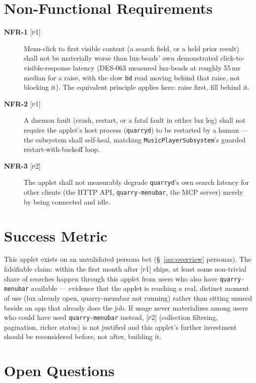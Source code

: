 \documentclass[a4paper,11pt]{report}
\newcommand{\nfr}[1]{\textbf{NFR-#1}}
\newcommand{\pone}{\textsc{[p1]}}
\newcommand{\ptwo}{\textsc{[p2]}}
\begin{document}
\section{Non-Functional Requirements}

\begin{description}
  \item[\nfr{1} \pone{}] Menu-click to first visible content (a search
    field, or a held prior result) shall not be materially worse than
    lux-beads' own demonstrated click-to-visible-response latency
    (DES-063 measured lux-beads at roughly 55\,ms median for a raise, with
    the slow \texttt{bd} read moving behind that raise, not blocking it).
    The equivalent principle applies here: raise first, fill behind it.
  \item[\nfr{2} \pone{}] A daemon fault (crash, restart, or a fatal fault
    in either lux leg) shall not require the applet's host process
    (\texttt{quarryd}) to be restarted by a human --- the subsystem shall
    self-heal, matching \texttt{MusicPlayerSubsystem}'s guarded
    restart-with-backoff loop.
  \item[\nfr{3} \ptwo{}] The applet shall not measurably degrade
    \texttt{quarryd}'s own search latency for other clients (the HTTP API,
    \texttt{quarry-menubar}, the MCP server) merely by being connected and
    idle.
\end{description}

\section{Success Metric}
\label{sec:metric}

This applet exists on an unvalidated persona bet (\S~\ref{sec:overview}
personas). The falsifiable claim: within the first month after \pone{}
ships, at least some non-trivial share of searches happen through this
applet from users who also have \texttt{quarry-menubar} available ---
evidence that the applet is reaching a real, distinct moment of use
(lux already open, quarry-menubar not running) rather than sitting
unused beside an app that already does the job. If usage never
materializes among users who could have used \texttt{quarry-menubar}
instead, \ptwo{} (collection filtering, pagination, richer status) is
not justified and this applet's further investment should be
reconsidered before, not after, building it.

\section{Open Questions}
\end{document}
